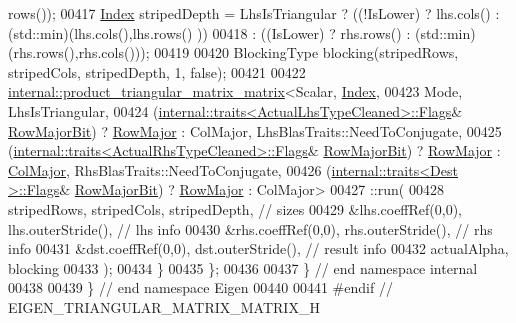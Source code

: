 \begin{DoxyCode}
      rows());
00417     \hyperlink{namespace_eigen_a62e77e0933482dafde8fe197d9a2cfde}{Index} stripedDepth = LhsIsTriangular ? ((!IsLower) ? lhs.cols() : (std::min)(lhs.cols(),lhs.rows()
      ))
00418                                          : ((IsLower)  ? rhs.rows() : (std::min)(rhs.rows(),rhs.cols()));
00419 
00420     BlockingType blocking(stripedRows, stripedCols, stripedDepth, 1, \textcolor{keyword}{false});
00421 
00422     \hyperlink{struct_eigen_1_1internal_1_1product__triangular__matrix__matrix}{internal::product\_triangular\_matrix\_matrix}<Scalar, 
      \hyperlink{namespace_eigen_a62e77e0933482dafde8fe197d9a2cfde}{Index},
00423       Mode, LhsIsTriangular,
00424       (\hyperlink{struct_eigen_1_1internal_1_1traits}{internal::traits<ActualLhsTypeCleaned>::Flags}&
      \hyperlink{group__flags_gae4f56c2a60bbe4bd2e44c5b19cbe8762}{RowMajorBit}) ? \hyperlink{group__enums_ggaacded1a18ae58b0f554751f6cdf9eb13acfcde9cd8677c5f7caf6bd603666aae3}{RowMajor} : ColMajor, LhsBlasTraits::NeedToConjugate,
00425       (\hyperlink{struct_eigen_1_1internal_1_1traits}{internal::traits<ActualRhsTypeCleaned>::Flags}&
      \hyperlink{group__flags_gae4f56c2a60bbe4bd2e44c5b19cbe8762}{RowMajorBit}) ? \hyperlink{group__enums_ggaacded1a18ae58b0f554751f6cdf9eb13acfcde9cd8677c5f7caf6bd603666aae3}{RowMajor} : \hyperlink{group__enums_ggaacded1a18ae58b0f554751f6cdf9eb13a0cbd4bdd0abcfc0224c5fcb5e4f6669a}{ColMajor}, RhsBlasTraits::NeedToConjugate,
00426       (\hyperlink{struct_eigen_1_1internal_1_1traits}{internal::traits<Dest          >::Flags}&
      \hyperlink{group__flags_gae4f56c2a60bbe4bd2e44c5b19cbe8762}{RowMajorBit}) ? \hyperlink{group__enums_ggaacded1a18ae58b0f554751f6cdf9eb13acfcde9cd8677c5f7caf6bd603666aae3}{RowMajor} : ColMajor>
00427       ::run(
00428         stripedRows, stripedCols, stripedDepth,   \textcolor{comment}{// sizes}
00429         &lhs.coeffRef(0,0), lhs.outerStride(),    \textcolor{comment}{// lhs info}
00430         &rhs.coeffRef(0,0), rhs.outerStride(),    \textcolor{comment}{// rhs info}
00431         &dst.coeffRef(0,0), dst.outerStride(),    \textcolor{comment}{// result info}
00432         actualAlpha, blocking
00433       );
00434   \}
00435 \};
00436 
00437 \} \textcolor{comment}{// end namespace internal}
00438 
00439 \} \textcolor{comment}{// end namespace Eigen}
00440 
00441 \textcolor{preprocessor}{#endif // EIGEN\_TRIANGULAR\_MATRIX\_MATRIX\_H}
\end{DoxyCode}
